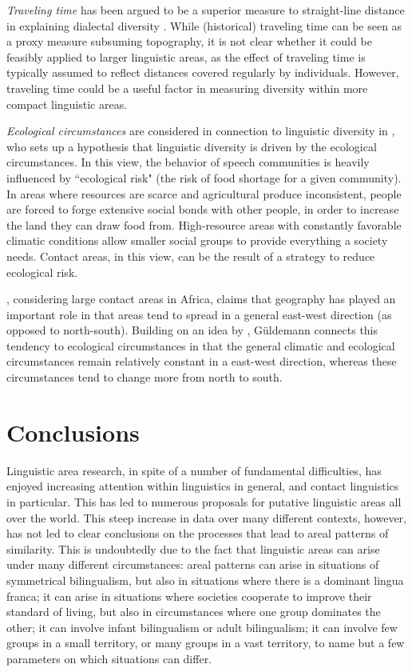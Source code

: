 \documentclass[output=paper,
modfonts
]{langscibook}
\begin{document}
\textit{Traveling time} has been argued to be a superior measure to straight-line distance in explaining dialectal diversity \parencite{gooskens2005}. %
While (historical) traveling time can be seen as a proxy measure subsuming topography, it is not clear whether it could be feasibly applied to larger linguistic areas, as the effect of traveling time is typically assumed to reflect distances covered regularly by individuals. However, traveling time could be a useful factor in measuring diversity within more compact linguistic areas.

\textit{Ecological circumstances} are considered in connection to linguistic diversity in  \textcite{nettle1999linguistic}, who sets up a hypothesis that linguistic diversity is driven by the ecological circumstances. In this view, the behavior of speech communities is heavily influenced by ``ecological risk" (the risk of food shortage for a given community). In areas where resources
are scarce and agricultural produce inconsistent, people are forced to forge extensive
social bonds with other people, in order to increase the land they can draw food from.
High-resource areas with constantly favorable climatic conditions allow smaller social groups to provide everything a society needs. Contact areas, in this view, can be the result of a strategy to reduce ecological risk. 

\textcite{gueldemann2011sprachraum}, considering large contact areas in Africa, claims that geography has played an important role in that areas tend to spread in a general east-west direction (as opposed to north-south). Building on an idea by \textcite{diamond1997guns}, Güldemann connects this tendency to ecological circumstances in that the general climatic and ecological circumstances remain relatively constant in a east-west direction, whereas these circumstances tend to change more from north to south.


\section{Conclusions}

Linguistic area research, in spite of a number of fundamental difficulties, has enjoyed increasing attention within linguistics in general, and contact linguistics in particular. This has led to numerous proposals for putative linguistic areas all over the world. This steep increase in data over many different contexts, however, has not led to clear conclusions on the processes that lead to areal patterns of similarity. This is undoubtedly due to the fact that linguistic areas can arise under many different circumstances: areal patterns can arise in situations of symmetrical bilingualism, but also in situations where there is a dominant lingua franca; it can arise in situations where societies cooperate to improve their standard of living, but also in circumstances where one group dominates the other; it can involve infant bilingualism or adult bilingualism; it can involve few groups in a small territory, or many groups in a vast territory, to name but a few parameters on which situations can differ.
\end{document}
